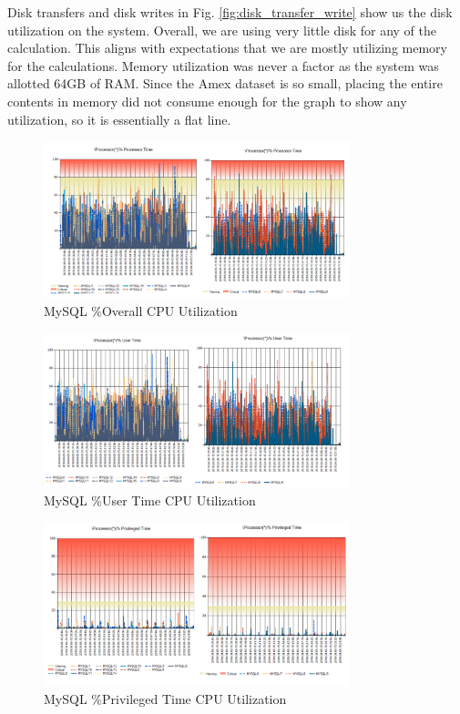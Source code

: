 \documentclass{IEEEtran}
\begin{document}
Disk transfers and disk writes in Fig. \ref{fig:disk_transfer_write} show us the disk utilization on the system. Overall, we are using very little disk for any of the calculation. This aligns with expectations that we are mostly utilizing memory for the calculations. Memory utilization was never a factor as the system was allotted 64GB of RAM. Since the Amex dataset is so small, placing the entire contents in memory did not consume enough for the graph to show any utilization, so it is essentially a flat line. 

\begin{figure}
	\centering
	\includegraphics[width=3.5in]{Images/overall_cpu.png}
	\caption{MySQL \%Overall CPU Utilization}
	\label{fig:overall_cpu}
\end{figure}

\begin{figure}
	\centering
	\includegraphics[width=3.5in]{Images/usertime_cpu.png}
	\caption{MySQL \%User Time CPU Utilization}
	\label{fig:usertime_cpu}
\end{figure}

\begin{figure}
	\centering
	\includegraphics[width=3.5in]{Images/privilegedtime_cpu.png}
	\caption{MySQL \%Privileged Time CPU Utilization}
	\label{fig:privilegedtime_cpu}
\end{figure}
\end{document}
